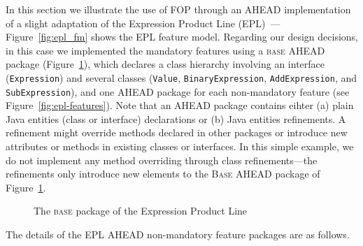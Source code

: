 In this section we illustrate the use of FOP through an AHEAD implementation 
of a slight adaptation of the Expression Product Line (EPL)~\cite{}---Figure~\ref{fig:epl_fm} shows 
the EPL feature model. Regarding our design decisions, 
in this case we implemented the mandatory features using a \textsc{base} AHEAD package (Figure~\ref{fig:epl-base}), which
declares a class hierarchy involving an interface (\texttt{Expression}) and
several classes (\texttt{Value}, \texttt{BinaryExpression}, \texttt{AddExpression}, and 
\texttt{SubExpression}), and one AHEAD package for each non-mandatory feature (see Figure~\ref{fig:epl-features}). Note 
that an AHEAD package contains eihter (a) plain Java entities (class or interface) declarations or (b) 
Java entities refinements. A refinement 
might override methods declared in other packages or 
introduce new attributes or methods in existing classes 
or interfaces. In this simple example, we do not implement any 
method overriding through class refinements---the refinements 
only introduce new elements to the \textsc{Base} AHEAD package 
of Figure~\ref{fig:epl-base}.  

\begin{figure}[htb]
\label{fig:epl-base}
\caption{The \textsc{base} package of the Expression Product Line}
\end{figure} 

The details of the EPL AHEAD non-mandatory feature packages are as follows. 

